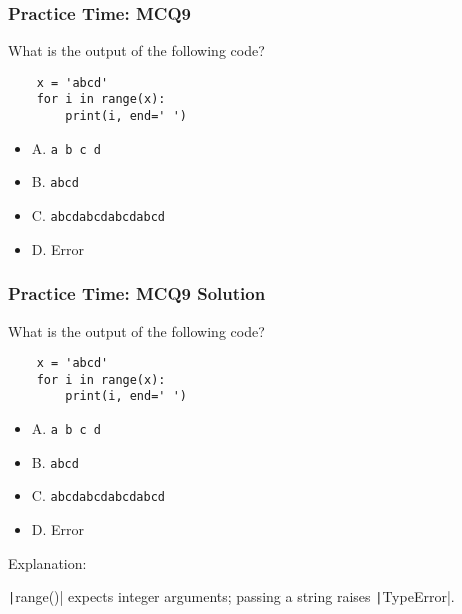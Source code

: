 \documentclass{beamer}
\begin{document}
\begin{frame}[fragile]
    \frametitle{Practice Time: MCQ9}
    What is the output of the following code?
    \begin{verbatim}
    x = 'abcd'
    for i in range(x):
        print(i, end=' ')
    \end{verbatim}
    \begin{itemize}
        \item A. \texttt{a b c d}
        \item B. \texttt{abcd}
        \item C. \texttt{abcdabcdabcdabcd}
        \item D. Error
    \end{itemize}
\end{frame}
\begin{frame}[fragile]
    \frametitle{Practice Time: MCQ9 Solution}
    What is the output of the following code?
    \begin{verbatim}
    x = 'abcd'
    for i in range(x):
        print(i, end=' ')
    \end{verbatim}
    \begin{itemize}
        \item A. \texttt{a b c d}
        \item B. \texttt{abcd}
        \item C. \texttt{abcdabcdabcdabcd}
        \item \alert{D. Error}
    \end{itemize}

    Explanation:

    \texttt|range()| expects integer arguments;
    passing a string raises \texttt|TypeError|.
\end{frame}
\end{document}
